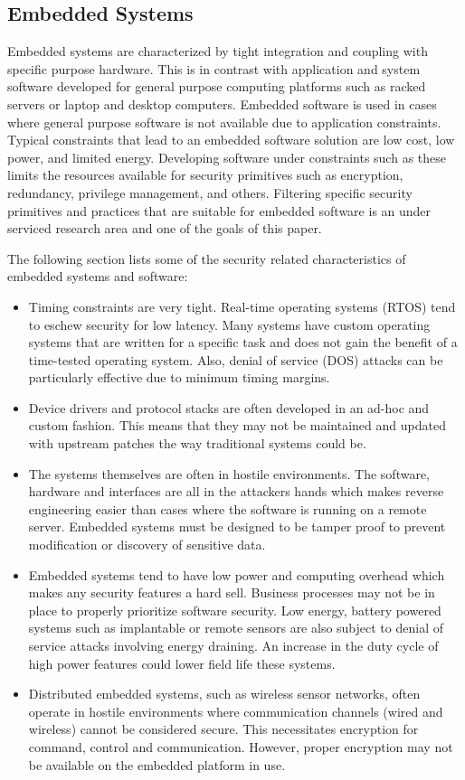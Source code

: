 \documentclass[draftcls,onecolumn,conference,12pt]{IEEEtran}
\begin{document}
\subsection{Embedded Systems}

Embedded systems are characterized by tight integration and coupling with specific purpose hardware.  This is in contrast with application and system software developed for general purpose computing platforms such as racked servers or laptop and desktop computers.  Embedded software is used in cases where general purpose software is not available due to application constraints.  Typical constraints that lead to an embedded software solution are low cost, low power, and limited energy. Developing software under constraints such as these limits the resources available for security primitives such as encryption, redundancy, privilege management, and others.  Filtering specific security primitives and practices that are suitable for embedded software is an under serviced research area and one of the goals of this paper.

The following section lists some of the security related characteristics of embedded systems and software:

\begin{itemize}
\item 
Timing constraints are very tight.  Real-time operating systems (RTOS) tend to eschew security for low latency.  Many systems have custom operating systems that are written for a specific task and does not gain the benefit of a time-tested operating system.  Also, denial of service (DOS) attacks can be particularly effective due to minimum timing margins. \cite{Catal2011}
\item
Device drivers and protocol stacks are often developed in an ad-hoc and custom fashion.  This means that they may not be maintained and updated with upstream patches the way traditional systems could be.
\item 
The systems themselves are often in hostile environments. The software, hardware and interfaces are all in the attackers hands which makes reverse engineering easier than cases where the software is running on a remote server.  Embedded systems must be designed to be tamper proof to prevent modification or discovery of sensitive data.
\item 
Embedded systems tend to have low power and computing overhead which makes any security features a hard sell. Business processes may not be in place to properly prioritize software security.
Low energy, battery powered systems such as implantable or remote sensors are also subject to denial of service attacks involving energy draining.  An increase in the duty cycle of high power features could lower field life these systems. \cite{Vasserman2013}
\item 
Distributed embedded systems, such as wireless sensor networks, often operate in hostile environments where communication channels (wired and wireless) cannot be considered secure.  This necessitates encryption for command, control and communication. However, proper encryption may not be available on the embedded platform in use. \cite{Bojinov2010}
\end{itemize}
\end{document}
